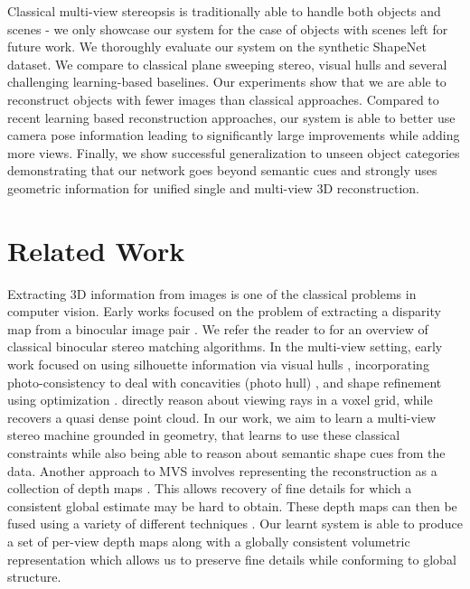 \documentclass[../thesis.tex]{subfiles}
\begin{document}
Classical multi-view stereopsis is traditionally able to handle both objects and scenes - we only showcase our system for the case of objects with scenes left for future work. We thoroughly evaluate our system on the synthetic ShapeNet~\cite{shapenet2015} dataset. We compare to classical plane sweeping stereo, visual hulls and several challenging learning-based baselines. Our experiments show that we are able to reconstruct objects with fewer images than classical approaches. Compared to recent learning based reconstruction approaches, our system is able to better use camera pose information leading to significantly large improvements while adding more views. Finally, we show successful generalization to unseen object categories demonstrating that our network goes beyond semantic cues and strongly uses geometric information for unified single and multi-view 3D reconstruction.



\section{Related Work}
Extracting 3D information from images is one of the classical problems in computer vision. Early works focused on the problem of extracting a disparity map from a binocular image pair \cite{marr1976cooperative}. We refer the reader to \cite{scharstein2002taxonomy} for an overview of classical binocular stereo matching algorithms.
In the multi-view setting, early work focused on using silhouette information via visual hulls \cite{laurentini1994visual}, incorporating photo-consistency to deal with concavities (photo hull) \cite{kutulakos2000theory}, and shape refinement using optimization \cite{vogiatzis2005multi, sinha2007multi, cremers2011multiview, gargallo2007minimizing}. \cite{pollard2007change, liu2014statistical,ulusoy2015towards} directly reason about viewing rays in a voxel grid, while \cite{lhuillier2005quasi} recovers a quasi dense point cloud. In our work, we aim to learn a multi-view stereo machine grounded in geometry, that learns to use these classical constraints while also being able to reason about semantic shape cues from the data.
Another approach to MVS involves representing the reconstruction as a collection of depth maps \cite{collins1996space,yang2003real,pollefeys2004visual,FuruPMVS2010,pollefeys2008detailed}. This allows recovery of fine details for which a consistent global estimate may be hard to obtain. These depth maps can then be fused using a variety of different techniques \cite{merrell2007real,curless1996volumetric,lempitsky2007global,zach2007globally,labatut2007efficient}. Our learnt system is able to produce a set of per-view depth maps along with a globally consistent volumetric representation which allows us to preserve fine details while conforming to global structure.
\end{document}
